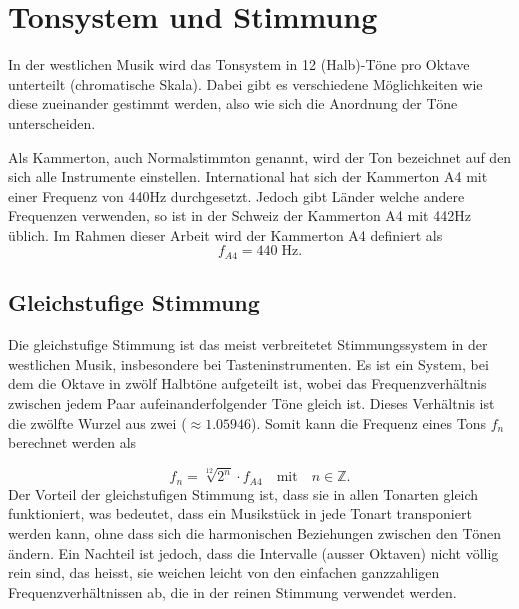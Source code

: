 %
%
%
%
\section{Tonsystem und Stimmung
\label{autotune:section:tonsystemUndStimmung}}
In der westlichen Musik wird das Tonsystem in 12 (Halb)-Töne pro Oktave unterteilt (chromatische Skala).
Dabei gibt es verschiedene Möglichkeiten wie diese zueinander gestimmt werden, also wie sich die Anordnung der Töne unterscheiden.

Als Kammerton, auch Normalstimmton genannt, wird der Ton bezeichnet auf den sich alle Instrumente einstellen.
International hat sich der Kammerton A4 mit einer Frequenz von 440\;Hz durchgesetzt.
Jedoch gibt Länder welche andere Frequenzen verwenden, so ist in der Schweiz der Kammerton A4 mit 442\;Hz üblich.
Im Rahmen dieser Arbeit wird der Kammerton A4 definiert als 
\begin{equation}
    f_{A4}
    =
    440\;\text{Hz}.
\end{equation}

\subsection{Gleichstufige Stimmung
\label{autotune:subsection:gleichstuffigeStimmung}}
Die gleichstufige Stimmung ist das meist verbreitetet Stimmungssystem in der westlichen Musik, insbesondere bei Tasteninstrumenten.
Es ist ein System, bei dem die Oktave in zwölf Halbtöne aufgeteilt ist,
wobei das Frequenzverhältnis zwischen jedem Paar aufeinanderfolgender Töne gleich ist.
Dieses Verhältnis ist die zwölfte Wurzel aus zwei ($\approx 1.05946$). Somit kann die Frequenz eines Tons $f_n$ berechnet werden als

\begin{equation}
    f_n
    =
    \sqrt[12]{2^n} \cdot f_{A4}
    \quad \text{mit} \quad
    n \in \mathbb{Z}.
\end{equation}
Der Vorteil der gleichstufigen Stimmung ist, dass sie in allen Tonarten gleich funktioniert, was bedeutet,
dass ein Musikstück in jede Tonart transponiert werden kann, ohne dass sich die harmonischen Beziehungen zwischen den Tönen ändern.
Ein Nachteil ist jedoch, dass die Intervalle (ausser Oktaven) nicht völlig rein sind, das heisst,
sie weichen leicht von den einfachen ganzzahligen Frequenzverhältnissen ab, die in der reinen Stimmung verwendet werden.

